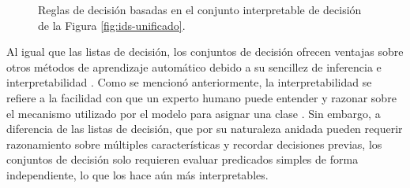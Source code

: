 \begin{figure}[H]
\centering
{}
\caption{Reglas de decisión basadas en el conjunto interpretable de decisión de la Figura \ref{fig:ids-unificado}.}
\end{figure}

Al igual que las listas de decisión, los conjuntos de decisión ofrecen ventajas sobre otros métodos de aprendizaje automático debido a su sencillez de inferencia e interpretabilidad \cite{Ignatiev-2018, Liu-2015}. Como se mencionó anteriormente, la interpretabilidad se refiere a la facilidad con que un experto humano puede entender y razonar sobre el mecanismo utilizado por el modelo para asignar una clase \cite{Rudin-2019}. Sin embargo, a diferencia de las listas de decisión, que por su naturaleza anidada pueden requerir razonamiento sobre múltiples características y recordar decisiones previas, los conjuntos de decisión solo requieren evaluar predicados simples de forma independiente, lo que los hace aún más interpretables.

